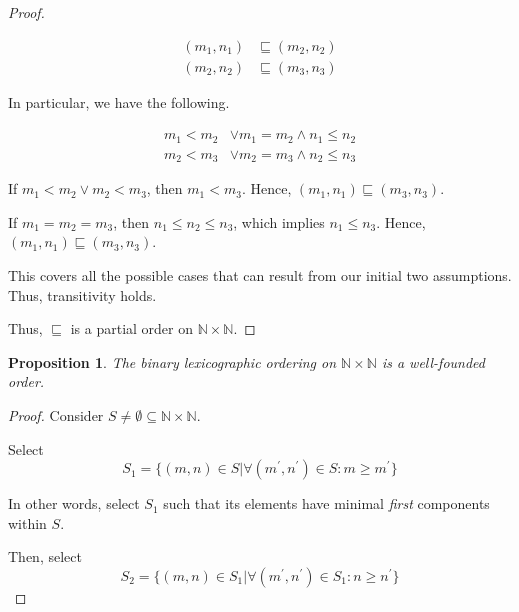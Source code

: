 \documentclass[letterpaper,11pt]{article}
\newcommand{\N}{\mathbb{N}}
\newtheorem{proposition}{Proposition}
\begin{document}
\begin{description}
\begin{proof}
\begin{description}
                \begin{align*}
                    (m_1,n_1)&\sqsubseteq(m_2,n_2)\\
                    (m_2,n_2)&\sqsubseteq(m_3,n_3)
                \end{align*}

                In particular, we have the following.

                \begin{align}
                    m_1<m_2 &\lor m_1 = m_2 \land n_1 \leq n_2
                        \label{eq:trans1} \\
                    m_2<m_3 &\lor m_2 = m_3 \land n_2 \leq n_3
                        \label{eq:trans2}
                \end{align}

                If $m_1 < m_2 \lor m_2 < m_3$, then $m_1 < m_3$.
                Hence, $(m_1, n_1) \sqsubseteq (m_3, n_3)$.

                If $m_1 = m_2 = m_3$, then $n_1 \leq n_2 \leq n_3$, which
                implies $n_1 \leq n_3$.
                Hence, $(m_1, n_1) \sqsubseteq (m_3, n_3)$.

                This covers all the possible cases that can result from our
                initial two assumptions. Thus, transitivity holds.
        \end{description}

        Thus, $\sqsubseteq$ is a partial order on $\N \times \N$.
    \end{proof}

    \begin{proposition}
        The binary lexicographic ordering on $\N \times \N$ is a well-founded
        order.
    \end{proposition}

    \begin{proof}
        Consider $S \neq \emptyset \subseteq \N \times \N$.

        Select
        $$
        S_1 = \{
            (m, n) \in S
            | \forall (m^\prime, n^\prime) \in S : m \geq m^\prime
        \}
        $$

        In other words, select $S_1$ such that its elements have minimal
        \emph{first} components within $S$.

        Then, select
        $$
        S_2 = \{
            (m, n) \in S_1
            | \forall (m^\prime, n^\prime) \in S_1 : n \geq n^\prime
        \}
        $$


\end{proof}
\end{description}
\end{document}
